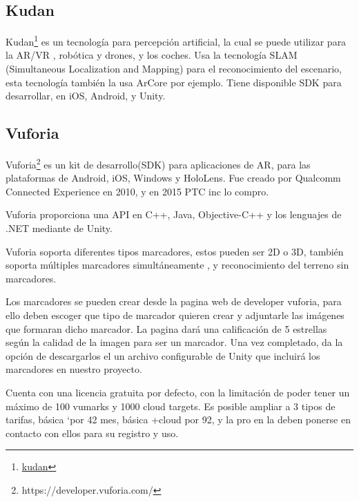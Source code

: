 \subsection{Kudan} Kudan\footnote{\href{https://www.xlsoft.com/en/products/kudan/?utm_source=google&utm_medium=adwords&utm_campaign=cp01&gclid=Cj0KCQiAvJXxBRCeARIsAMSkAprma7nGzsXVWd9w5H4HSQzNoOkF2eJu8LzAtEXbaDALYPUdfBOOgpEaAoqoEALw_wcB}{kudan}} es un tecnología para percepción artificial, la cual se puede utilizar para la AR/VR , robótica y drones, y los coches.
Usa la tecnología SLAM (Simultaneous Localization and Mapping) para el reconocimiento del escenario, esta tecnología también la usa ArCore por ejemplo.
Tiene disponible SDK para desarrollar, en iOS, Android, y Unity.

\subsection{Vuforia}
Vuforia\footnote{https://developer.vuforia.com/} es un kit de desarrollo(SDK) para aplicaciones de AR, para las plataformas de Android, iOS, Windows y HoloLens. Fue creado por Qualcomm Connected Experience en 2010, y en 2015 PTC inc lo compro.\cite{simonetti2013vuforia}

Vuforia proporciona una API en C++, Java, Objective-C++ y los lenguajes de .NET mediante de Unity.

Vuforia soporta diferentes tipos marcadores, estos pueden ser 2D o 3D, también soporta múltiples marcadores simultáneamente , y reconocimiento del terreno sin marcadores.

Los marcadores se pueden crear desde la pagina web de developer vuforia, para ello deben escoger que tipo de marcador quieren crear y adjuntarle las imágenes que formaran dicho marcador. La pagina dará una calificación de 5 estrellas según la calidad de la imagen para ser un marcador. Una vez completado, da la opción de descargarlos el un archivo configurable de Unity que incluirá los marcadores en nuestro proyecto.



Cuenta con una licencia gratuita por defecto, con la limitación de poder tener un máximo de 100 vumarks y 1000 cloud targets.
Es posible ampliar a 3 tipos de tarifas, básica `por 42 mes, básica +cloud por 92, y la pro en la deben ponerse en contacto con ellos para su registro y uso.

